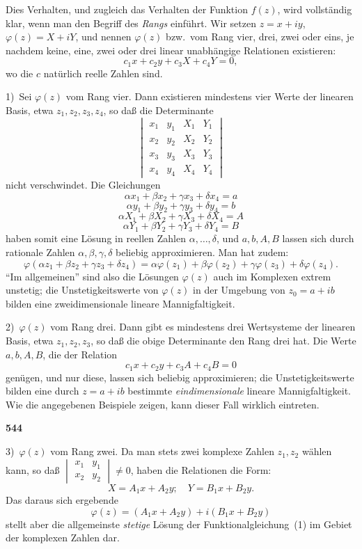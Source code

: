 \documentclass[12pt,a4paper]{article}
\begin{document}
Dies Verhalten, und zugleich das Verhalten der Funktion $f(z)$, wird vollst\"andig klar, wenn man den Begriff des \emph{Rangs} einf\"uhrt. Wir setzen $z = x + iy$, $\varphi(z) = X + iY$, und nennen $\varphi(z)$ bzw.\ vom Rang vier, drei, zwei oder eins, je nachdem keine, eine, zwei oder drei linear unabh\"angige Relationen existieren:
\[c_1 x + c_2 y + c_3 X + c_4 Y = 0,\]
wo die $c$ nat\"urlich reelle Zahlen sind.

1)\ Sei $\varphi(z)$ vom Rang vier. Dann existieren mindestens vier Werte der linearen Basis, etwa $z_1, z_2, z_3, z_4$, so da\ss{} die Determinante
\[\begin{vmatrix}
x_1 & y_1 & X_1 & Y_1 \\
x_2 & y_2 & X_2 & Y_2 \\
x_3 & y_3 & X_3 & Y_3 \\
x_4 & y_4 & X_4 & Y_4
\end{vmatrix}\]
nicht verschwindet. Die Gleichungen
\[\alpha x_1 + \beta x_2 + \gamma x_3 + \delta x_4 = a\]
\[\alpha y_1 + \beta y_2 + \gamma y_3 + \delta y_4 = b\]
\[\alpha X_1 + \beta X_2 + \gamma X_3 + \delta X_4 = A\]
\[\alpha Y_1 + \beta Y_2 + \gamma Y_3 + \delta Y_4 = B\]
haben somit eine L\"osung in reellen Zahlen $\alpha, \ldots, \delta$, und $a, b, A, B$ lassen sich durch rationale Zahlen $\alpha, \beta, \gamma, \delta$ beliebig approximieren. Man hat zudem:
\[\varphi(\alpha z_1 + \beta z_2 + \gamma z_3 + \delta z_4) = \alpha \varphi(z_1) + \beta \varphi(z_2) + \gamma \varphi(z_3) + \delta \varphi(z_4).\]
``Im allgemeinen'' sind also die L\"osungen $\varphi(z)$ auch im Komplexen extrem unstetig; die Unstetigkeitswerte von $\varphi(z)$ in der Umgebung von $z_0 = a + ib$ bilden eine zweidimensionale lineare Mannigfaltigkeit.

2)\ $\varphi(z)$ vom Rang drei. Dann gibt es mindestens drei Wertsysteme der linearen Basis, etwa $z_1, z_2, z_3$, so da\ss{} die obige Determinante den Rang drei hat. Die Werte $a, b, A, B$, die der Relation
\[c_1 x + c_2 y + c_3 A + c_4 B = 0\]
gen\"ugen, und nur diese, lassen sich beliebig approximieren; die Unstetigkeitswerte bilden eine durch $z = a + ib$ bestimmte \emph{eindimensionale} lineare Mannigfaltigkeit. Wie die angegebenen Beispiele zeigen, kann dieser Fall wirklich eintreten.

\newpage
\begin{center}
\textbf{544}
\end{center}

3)\ $\varphi(z)$ vom Rang zwei. Da man stets zwei komplexe Zahlen $z_1, z_2$ w\"ahlen kann, so da\ss{} $\begin{vmatrix} x_1 & y_1 \\ x_2 & y_2 \end{vmatrix} \neq 0$, haben die Relationen die Form:
\[X = A_1 x + A_2 y; \quad Y = B_1 x + B_2 y.\]
Das daraus sich ergebende
\[\varphi(z) = (A_1 x + A_2 y) + i(B_1 x + B_2 y)\]
stellt aber die allgemeinste \emph{stetige} L\"osung der Funktionalgleichung~(1) im Gebiet der komplexen Zahlen dar.
\end{document}
